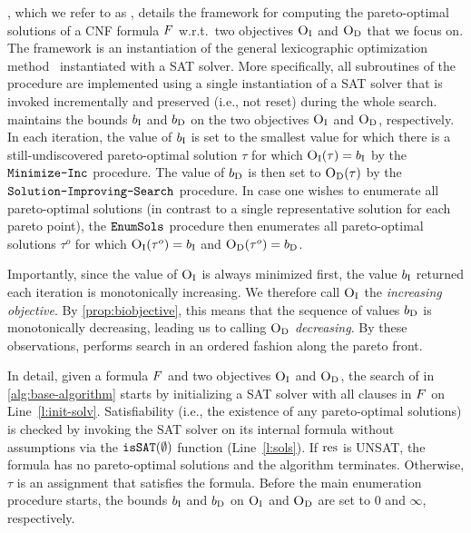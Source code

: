 , which we refer to as \algname{}, details the  framework for computing the pareto-optimal solutions of a CNF formula $F$ w.r.t.\ two objectives $\textsc{O}_{\text{I}}$ and $\textsc{O}_{\text{D}}$ that we focus on.
The framework is an instantiation of the general lexicographic optimization method~\autocite{survey} instantiated with a SAT solver.
More specifically, all subroutines of the procedure are implemented using a single instantiation of a SAT solver that is invoked incrementally and preserved (i.e., not reset) during the whole search. 
\algname{} maintains the bounds $b_{\text{I}}$ and $b_{\text{D}}$ on the two objectives $\textsc{O}_{\text{I}}$ and $\textsc{O}_{\text{D}}$, respectively.
In each iteration, the value of $b_{\text{I}}$ is set to the smallest value for which there is a still-undiscovered pareto-optimal solution $\tau$ for which $\textsc{O}_{\text{I}}(\tau) = b_{\text{I}}$ by the $\texttt{Minimize-\allowbreak{}Inc}$ procedure.
The value of $b_{\text{D}}$ is then set to $\textsc{O}_{\text{D}}(\tau)$ by the $\texttt{Solution-\allowbreak{}Improving-\allowbreak{}Search}$ procedure.
In case one wishes to enumerate all pareto-optimal solutions (in contrast to a single representative solution for each pareto point), the $\texttt{EnumSols}$ procedure then enumerates all pareto-optimal solutions $\tau^o$ for which $\textsc{O}_{\text{I}}(\tau^o) = b_{\text{I}}$ and $\textsc{O}_{\text{D}}(\tau^o) = b_{\text{D}}$.

Importantly, since the value of $\textsc{O}_{\text{I}}$ is always minimized first, the value $b_{\text{I}}$ returned each iteration is monotonically increasing. 
We therefore call $\textsc{O}_{\text{I}}$ the \emph{increasing objective}.
By \cref{prop:biobjective}, this means that the sequence of values $b_{\text{D}}$ is monotonically decreasing, leading us to calling $\textsc{O}_{\text{D}}$ \emph{decreasing}.
By these observations, \algname{} performs search in an ordered fashion along the pareto front.

In detail, given a formula $F$ and two objectives $\textsc{O}_{\text{I}}$ and $\textsc{O}_{\text{D}}$, the search of \algname{} in \cref{alg:base-algorithm} starts by initializing a SAT solver with all clauses in $F$ on Line~\ref{l:init-solv}.
Satisfiability (i.e., the existence of any pareto-optimal solutions) is checked by invoking the SAT solver on its internal formula without assumptions via the $\texttt{isSAT}(\emptyset)$ function (Line~\ref{l:sols}).
If $\text{res}$ is UNSAT, the formula has no pareto-optimal solutions and the algorithm terminates.
Otherwise, $\tau$ is an assignment that satisfies the formula.
Before the main enumeration procedure starts, the bounds $b_{\text{I}}$ and $b_{\text{D}}$ on $\textsc{O}_{\text{I}}$ and $\textsc{O}_{\text{D}}$ are set to $0$ and $\infty$, respectively.

